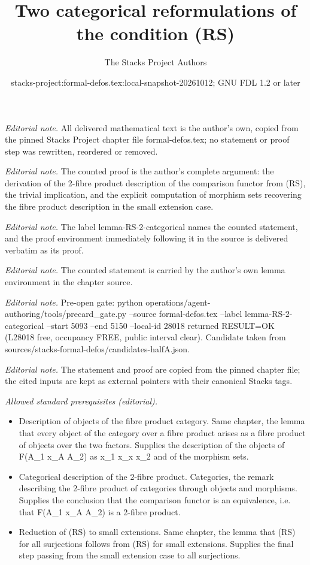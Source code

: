 \documentclass[10pt,a4paper]{amsart}
\title{Two categorical reformulations of the condition (RS)}
\author{The Stacks Project Authors}
\date{stacks-project:formal-defos.tex:local-snapshot-20261012; GNU FDL 1.2 or later}
\theoremstyle{plain}
\theoremstyle{definition}
\theoremstyle{remark}
\numberwithin{equation}{subsection}
\begin{document}
\maketitle
\noindent\textit{Editorial note.} All delivered mathematical text is the author's own, copied from the pinned Stacks Project chapter file formal-defos.tex; no statement or proof step was rewritten, reordered or removed.\par\medskip
\noindent\textit{Editorial note.} The counted proof is the author's complete argument: the derivation of the 2-fibre product description of the comparison functor from (RS), the trivial implication, and the explicit computation of morphism sets recovering the fibre product description in the small extension case.\par\medskip
\noindent\textit{Editorial note.} The label lemma-RS-2-categorical names the counted statement, and the proof environment immediately following it in the source is delivered verbatim as its proof.\par\medskip
\noindent\textit{Editorial note.} The counted statement is carried by the author's own lemma environment in the chapter source.\par\medskip
\noindent\textit{Editorial note.} Pre-open gate: python operations/agent-authoring/tools/precard\_gate.py --source formal-defos.tex --label lemma-RS-2-categorical --start 5093 --end 5150 --local-id 28018 returned RESULT=OK (L28018 free, occupancy FREE, public interval clear). Candidate taken from sources/stacks-formal-defos/candidates-halfA.json.\par\medskip
\noindent\textit{Editorial note.} The statement and proof are copied from the pinned chapter file; the cited inputs are kept as external pointers with their canonical Stacks tags.\par\medskip
\noindent\textit{Allowed standard prerequisites (editorial).}\begin{itemize}
\item Description of objects of the fibre product category. Same chapter, the lemma that every object of the category over a fibre product arises as a fibre product of objects over the two factors. Supplies the description of the objects of F(A\_1 x\_A A\_2) as x\_1 x\_x x\_2 and of the morphism sets.
\item Categorical description of the 2-fibre product. Categories, the remark describing the 2-fibre product of categories through objects and morphisms. Supplies the conclusion that the comparison functor is an equivalence, i.e. that F(A\_1 x\_A A\_2) is a 2-fibre product.
\item Reduction of (RS) to small extensions. Same chapter, the lemma that (RS) for all surjections follows from (RS) for small extensions. Supplies the final step passing from the small extension case to all surjections.
\end{itemize}\medskip
\end{document}
